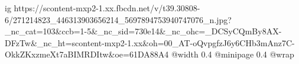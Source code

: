  
 
 
 
 

\ifcmt
  ig https://scontent-mxp2-1.xx.fbcdn.net/v/t39.30808-6/271214823_446313903656214_5697894753940747076_n.jpg?_nc_cat=103&ccb=1-5&_nc_sid=730e14&_nc_ohc=_DCSyCQmBy8AX-DFzTw&_nc_ht=scontent-mxp2-1.xx&oh=00_AT-oQvpgfzJ6y6CHb3mAnz7C-OkkZKxzmeXt7aBIMRDItw&oe=61DA88A4
  @width 0.4
  @minipage 0.4
  @wrap \parpic[r]
\fi
